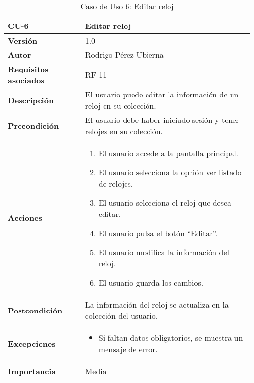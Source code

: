 \begin{table}[p]
	\centering
	\begin{tabularx}{\linewidth}{ p{} p{} }
		\toprule
		\textbf{CU-6} & \textbf{Editar reloj}\\
		\toprule
		\textbf{Versión} & 1.0 \\
		\textbf{Autor} & Rodrigo Pérez Ubierna \\
		\textbf{Requisitos asociados} & RF-11 \\
		\textbf{Descripción} & El usuario puede editar la información de un reloj en su colección. \\
		\textbf{Precondición} & El usuario debe haber iniciado sesión y tener relojes en su colección. \\
		\textbf{Acciones} &
		\begin{enumerate}
			\def\labelenumi{\arabic{enumi}.}
			\tightlist
			\item El usuario accede a la pantalla principal.
			\item El usuario selecciona la opción ver listado de relojes.
			\item El usuario selecciona el reloj que desea editar.
			\item El usuario pulsa el botón ``Editar''.
			\item El usuario modifica la información del reloj.
			\item El usuario guarda los cambios.
		\end{enumerate}\\
		\textbf{Postcondición} & La información del reloj se actualiza en la colección del usuario. \\
		\textbf{Excepciones} &
			\begin{itemize}
				\item Si faltan datos obligatorios, se muestra un mensaje de error.
			\end{itemize} \\
		\textbf{Importancia} & Media \\
		\bottomrule
	\end{tabularx}
	\caption{Caso de Uso 6: Editar reloj}
\end{table}


